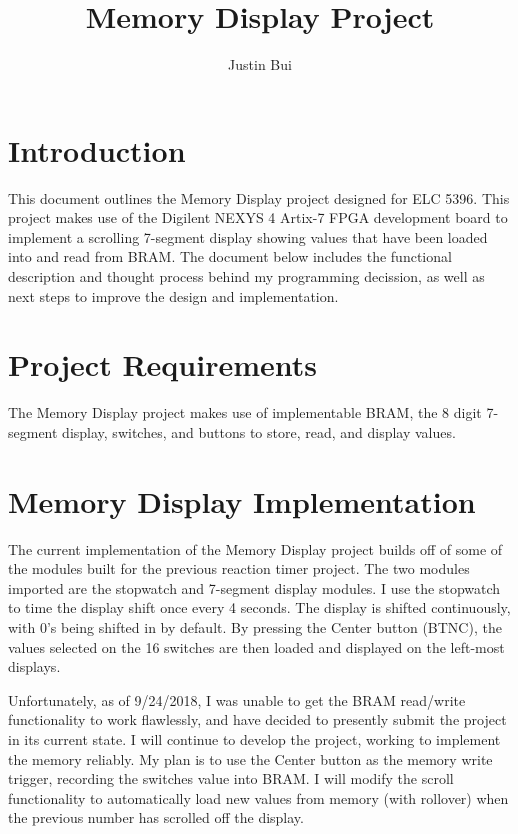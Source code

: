\documentclass{article}
\author{Justin Bui}
\title{Memory Display Project}
\begin{document}
\maketitle
\newpage

\tableofcontents
\newpage

\section{Introduction}
This document outlines the Memory Display project designed for ELC 5396. This project makes use of the Digilent NEXYS 4 Artix-7 FPGA development board to implement a scrolling 7-segment display showing values that have been loaded into and read from BRAM. The document below includes the functional description and thought process behind my programming decission, as well as next steps to improve the design and implementation.

\section{Project Requirements}
The Memory Display project makes use of implementable BRAM, the 8 digit 7-segment display, switches, and buttons to store, read, and display values. 

\section{Memory Display Implementation}
The current implementation of the Memory Display project builds off of some of the modules built for the previous reaction timer project. The two modules imported are the stopwatch and 7-segment display modules. I use the stopwatch to time the display shift once every 4 seconds. The display is shifted continuously, with 0's being shifted in by default. By pressing the Center button (BTNC), the values selected on the 16 switches are then loaded and displayed on the left-most displays. 

Unfortunately, as of 9/24/2018, I was unable to get the BRAM read/write functionality to work flawlessly, and have decided to presently submit the project in its current state. I will continue to develop the project, working to implement the memory reliably. My plan is to use the Center button as the memory write trigger, recording the switches value into BRAM. I will modify the scroll functionality to automatically load new values from memory (with rollover) when the previous number has scrolled off the display.
\end{document}
